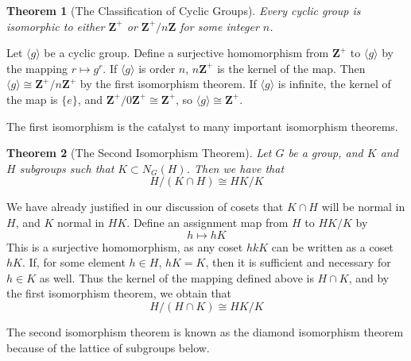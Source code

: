 \documentclass[12pt]{amsbook}
\makeatletter
\theoremstyle{plain}
\newtheorem{theorem}{Theorem}[chapter]
\theoremstyle{definition}
\renewenvironment{proof}[1][\proofname]{\par
  \pushQED{\qed}%
  \normalfont \topsep6\p@\@plus6\p@\relax
  \list{}{\leftmargin=0em
          \rightmargin=\leftmargin
          \settowidth{\itemindent}{\itshape#1}%
          \labelwidth=\itemindent}

  \item[\hskip\labelsep
        \itshape
    #1\@addpunct{.}]\ignorespaces
}{%
  \popQED\endlist\@endpefalse
}
\makeatother
\begin{document}
\begin{theorem}[The Classification of Cyclic Groups]
    Every cyclic group is isomorphic to either $\mathbf{Z}^+$ or $\mathbf{Z}^+/n\mathbf{Z}$ for some integer $n$.
\end{theorem}
\begin{proof}
Let $\langle g \rangle$ be a cyclic group. Define a surjective homomorphism from $\mathbf{Z}^+$ to $\langle g \rangle$ by the mapping $r \mapsto g^r$. If $\langle g \rangle$ is order $n$, $n\mathbf{Z}^+$ is the kernel of the map. Then $\langle g \rangle \cong \mathbf{Z}^+/n\mathbf{Z}^+$ by the first isomorphism theorem. If $\langle g \rangle$ is infinite, the kernel of the map is $\{ e \}$, and $\mathbf{Z}^+/0\mathbf{Z}^+ \cong \mathbf{Z}^+$, so $\langle g \rangle \cong \mathbf{Z}^+$.
\end{proof}

The first isomorphism is the catalyst to many important isomorphism theorems.

\begin{theorem}[The Second Isomorphism Theorem]  
    Let $G$ be a group, and $K$ and $H$ subgroups such that $K \subset N_G(H)$. Then we have that
    \[ H/(K \cap H) \cong HK/K \]
\end{theorem}
\begin{proof}
We have already justified in our discussion of cosets that $K \cap H$ will be normal in $H$, and $K$ normal in $HK$. Define an assignment map from $H$ to $HK/K$ by
%
\[ h \mapsto hK \]
%
This is a surjective homomorphism, as any coset $hkK$ can be written as a coset $hK$. If, for some element $h \in H$, $hK = K$, then it is sufficient and necessary for $h \in K$ as well. Thus the kernel of the mapping defined above is $H \cap K$, and by the first isomorphism theorem, we obtain that
%
\[ H/(H \cap K) \cong HK/K \]
\end{proof}

The second isomorphism theorem is known as the diamond isomorphism theorem because of the lattice of subgroups below.
\end{document}
